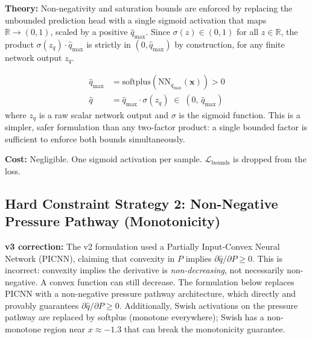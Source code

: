 \documentclass[12pt,a4paper]{article}
\begin{document}
\begin{mathbox}
\textbf{Theory:} Non-negativity and saturation bounds are enforced by
replacing the unbounded prediction head with a single sigmoid activation
that maps $\mathbb{R} \to (0, 1)$, scaled by a positive $\hat{q}_{\max}$.
Since $\sigma(z)\in(0,1)$ for all $z\in\mathbb{R}$, the product
$\sigma(z_q)\cdot\hat{q}_{\max}$ is strictly in $(0,\hat{q}_{\max})$
by construction, for any finite network output $z_q$.

\begin{align}
\hat{q}_{\max} &= \mathrm{softplus}\!\left(\mathrm{NN}_{q_{\max}}(\mathbf{x})\right) > 0 \\[4pt]
\hat{q} &= \hat{q}_{\max} \cdot \sigma(z_q)
  \;\in\; (0,\,\hat{q}_{\max})
\end{align}
where $z_q$ is a raw scalar network output and $\sigma$ is the sigmoid
function. This is a simpler, safer formulation than any two-factor
product: a single bounded factor is sufficient to enforce both bounds
simultaneously.

\textbf{Cost:} Negligible. One sigmoid activation per sample.
$\mathcal{L}_{\text{bounds}}$ is dropped from the loss.
\end{mathbox}

\subsection{Hard Constraint Strategy 2: Non-Negative Pressure Pathway (Monotonicity)}

\begin{changebox}
\textbf{v3 correction:} The v2 formulation used a Partially Input-Convex
Neural Network (PICNN), claiming that convexity in $P$ implies
$\partial\hat{q}/\partial P \geq 0$. This is incorrect: convexity implies
the derivative is \emph{non-decreasing}, not necessarily non-negative.
A convex function can still decrease. The formulation below replaces PICNN
with a non-negative pressure pathway architecture, which directly and
provably guarantees $\partial\hat{q}/\partial P \geq 0$.
Additionally, Swish activations on the pressure pathway are replaced by
softplus (monotone everywhere); Swish has a non-monotone region near
$x \approx -1.3$ that can break the monotonicity guarantee.
\end{changebox}
\end{document}
